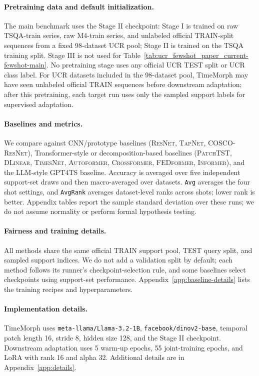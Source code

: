 \documentclass{article}
\begin{document}
\paragraph{Pretraining data and default initialization.}
The main benchmark uses the Stage II checkpoint: Stage I is trained on raw TSQA-train series, raw M4-train series, and unlabeled official TRAIN-split sequences from a fixed 98-dataset UCR pool; Stage II is trained on the TSQA training split. Stage III is not used for Table~\ref{tab:ucr_fewshot_paper_current-fewshot-main}. No pretraining stage uses any official UCR TEST split or UCR class label. For UCR datasets included in the 98-dataset pool, TimeMorph may have seen unlabeled official TRAIN sequences before downstream adaptation; after this pretraining, each target run uses only the sampled support labels for supervised adaptation.


\paragraph{Baselines and metrics.}
We compare against CNN/prototype baselines (\textsc{ResNet}, \textsc{TapNet}, \textsc{COSCO-ResNet}), Transformer-style or decomposition-based baselines (\textsc{PatchTST}, \textsc{DLinear}, \textsc{TimesNet}, \textsc{Autoformer}, \textsc{Crossformer}, \textsc{FEDformer}, \textsc{Informer}), and the LLM-style \textsc{GPT4TS} baseline. Accuracy is averaged over five independent support-set draws and then macro-averaged over datasets. \texttt{Avg} averages the four shot settings, and \texttt{AvgRank} averages dataset-level ranks across shots; lower rank is better. Appendix tables report the sample standard deviation over these runs; we do not assume normality or perform formal hypothesis testing.

\paragraph{Fairness and training details.}
All methods share the same official TRAIN support pool, TEST query split, and sampled support indices. We do not add a validation split by default; each method follows its runner's checkpoint-selection rule, and some baselines select checkpoints using support-set performance. Appendix~\ref{app:baseline-details} lists the training recipes and hyperparameters.

\paragraph{Implementation details.}
TimeMorph uses \texttt{meta-llama/Llama-3.2-1B}, \texttt{facebook/dinov2-base}, temporal patch length 16, stride 8, hidden size 128, and the Stage II checkpoint. Downstream adaptation uses 5 warm-up epochs, 55 joint-training epochs, and LoRA with rank 16 and alpha 32. Additional details are in Appendix~\ref{app:details}.
\end{document}

